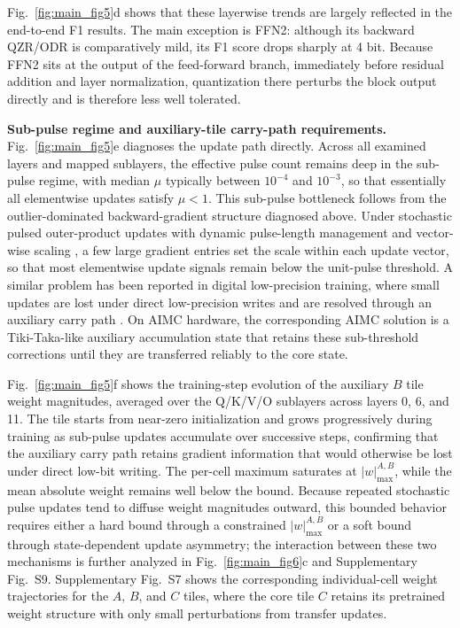 \documentclass[fleqn,10pt]{wlscirep}
\begin{document}
\noindent
Fig.~\ref{fig:main_fig5}d shows that these layerwise trends are largely reflected in the end-to-end F1 results. The main exception is FFN2: although its backward QZR/ODR is comparatively mild, its F1 score drops sharply at 4 bit. Because FFN2 sits at the output of the feed-forward branch, immediately before residual addition and layer normalization, quantization there perturbs the block output directly and is therefore less well tolerated.

\noindent\textbf{Sub-pulse regime and auxiliary-tile carry-path requirements.}
Fig.~\ref{fig:main_fig5}e diagnoses the update path directly. Across all examined layers and mapped sublayers, the effective pulse count remains deep in the sub-pulse regime, with median \(\mu\) typically between \(10^{-4}\) and \(10^{-3}\), so that essentially all elementwise updates satisfy \(\mu < 1\). This sub-pulse bottleneck follows from the outlier-dominated backward-gradient structure diagnosed above. Under stochastic pulsed outer-product updates with dynamic pulse-length management and vector-wise scaling \cite{rasch2021aihwkit,legallo2023aihwkit}, a few large gradient entries set the scale within each update vector, so that most elementwise update signals remain below the unit-pulse threshold. A similar problem has been reported in digital low-precision training, where small updates are lost under direct low-precision writes and are resolved through an auxiliary carry path \cite{nikdan2026eco}. On AIMC hardware, the corresponding AIMC solution is a Tiki-Taka-like auxiliary accumulation state that retains these sub-threshold corrections until they are transferred reliably to the core state. 

\noindent
Fig.~\ref{fig:main_fig5}f shows the training-step evolution of the auxiliary \(B\) tile weight magnitudes, averaged over the Q/K/V/O sublayers across layers 0, 6, and 11. The tile starts from near-zero initialization and grows progressively during training as sub-pulse updates accumulate over successive steps, confirming that the auxiliary carry path retains gradient information that would otherwise be lost under direct low-bit writing. The per-cell maximum saturates at \(|w|_{\max}^{A,B}\), while the mean absolute weight remains well below the bound. Because repeated stochastic pulse updates tend to diffuse weight magnitudes outward, this bounded behavior requires either a hard bound through a constrained \(|w|_{\max}^{A,B}\) or a soft bound through state-dependent update asymmetry; the interaction between these two mechanisms is further analyzed in Fig.~\ref{fig:main_fig6}c and Supplementary Fig.~S9. Supplementary Fig.~S7 shows the corresponding individual-cell weight trajectories for the \(A\), \(B\), and \(C\) tiles, where the core tile \(C\) retains its pretrained weight structure with only small perturbations from transfer updates.
\end{document}

